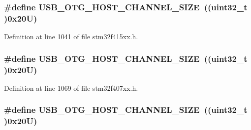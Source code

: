 \subsubsection[{\texorpdfstring{U\+S\+B\+\_\+\+O\+T\+G\+\_\+\+H\+O\+S\+T\+\_\+\+C\+H\+A\+N\+N\+E\+L\+\_\+\+S\+I\+ZE}{USB_OTG_HOST_CHANNEL_SIZE}}]{\setlength{\rightskip}{0pt plus 5cm}\#define U\+S\+B\+\_\+\+O\+T\+G\+\_\+\+H\+O\+S\+T\+\_\+\+C\+H\+A\+N\+N\+E\+L\+\_\+\+S\+I\+ZE~((uint32\+\_\+t )0x20\+U)}\hypertarget{group___peripheral__registers__structures_ga266cb1dbb50faf447f9c15d2ee93a522}{}\label{group___peripheral__registers__structures_ga266cb1dbb50faf447f9c15d2ee93a522}


Definition at line 1041 of file stm32f415xx.\+h.

\subsubsection[{\texorpdfstring{U\+S\+B\+\_\+\+O\+T\+G\+\_\+\+H\+O\+S\+T\+\_\+\+C\+H\+A\+N\+N\+E\+L\+\_\+\+S\+I\+ZE}{USB_OTG_HOST_CHANNEL_SIZE}}]{\setlength{\rightskip}{0pt plus 5cm}\#define U\+S\+B\+\_\+\+O\+T\+G\+\_\+\+H\+O\+S\+T\+\_\+\+C\+H\+A\+N\+N\+E\+L\+\_\+\+S\+I\+ZE~((uint32\+\_\+t )0x20\+U)}\hypertarget{group___peripheral__registers__structures_ga266cb1dbb50faf447f9c15d2ee93a522}{}\label{group___peripheral__registers__structures_ga266cb1dbb50faf447f9c15d2ee93a522}


Definition at line 1069 of file stm32f407xx.\+h.

\subsubsection[{\texorpdfstring{U\+S\+B\+\_\+\+O\+T\+G\+\_\+\+H\+O\+S\+T\+\_\+\+C\+H\+A\+N\+N\+E\+L\+\_\+\+S\+I\+ZE}{USB_OTG_HOST_CHANNEL_SIZE}}]{\setlength{\rightskip}{0pt plus 5cm}\#define U\+S\+B\+\_\+\+O\+T\+G\+\_\+\+H\+O\+S\+T\+\_\+\+C\+H\+A\+N\+N\+E\+L\+\_\+\+S\+I\+ZE~((uint32\+\_\+t )0x20\+U)}\hypertarget{group___peripheral__registers__structures_ga266cb1dbb50faf447f9c15d2ee93a522}{}\label{group___peripheral__registers__structures_ga266cb1dbb50faf447f9c15d2ee93a522}


